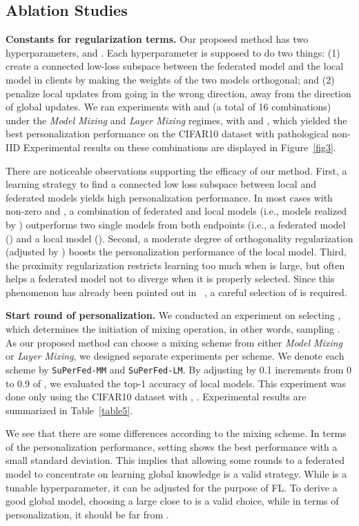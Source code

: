 \documentclass[sigconf]{acmart}
\begin{document}
\subsection{Ablation Studies} 
\noindent\textbf{Constants for regularization terms.} 
Our proposed method has two hyperparameters,  and . Each hyperparameter is supposed to do two things: (1) create a connected low-loss subspace between the federated model and the local model in clients by making the weights of the two models orthogonal; and (2) penalize local updates from going in the wrong direction, away from the direction of global updates.
We ran experiments with  and  (a total of 16 combinations) under the \textit{Model Mixing} and \textit{Layer Mixing} regimes, with  and , which yielded the best personalization performance on the CIFAR10 dataset with pathological non-IID Experimental results on these combinations are displayed in Figure~\ref{fig3}.

There are noticeable observations supporting the efficacy of our method. First, a learning strategy to find a connected low loss subspace between local and federated models yields high personalization performance. In most cases with non-zero  and , a combination of federated and local models (i.e., models realized by ) outperforms two single models from both endpoints (i.e., a federated model () and a local model (). Second, a moderate degree of orthogonality regularization (adjusted by ) boosts the personalization performance of the local model.
Third, the proximity regularization restricts learning too much when  is large, but often helps a federated model not to diverge when it is properly selected. Since this phenomenon has already been pointed out in ~\cite{fedprox, pfedme}, a careful selection of  is required.

\smallskip
\noindent\textbf{Start round of personalization.} We conducted an experiment on selecting , which determines the initiation of mixing operation, in other words, sampling . As our proposed method can choose a mixing scheme from either \textit{Model Mixing} or \textit{Layer Mixing}, we designed separate experiments per scheme. We denote each scheme by \texttt{SuPerFed-MM} and \texttt{SuPerFed-LM}. By adjusting  by 0.1 increments from 0 to 0.9 of , we evaluated the top-1 accuracy of local models. This experiment was done only using the CIFAR10 dataset with , . Experimental results are summarized in Table~\ref{table5}. 

We see that there are some differences according to the mixing scheme. In terms of the personalization performance, setting  shows the best performance with a small standard deviation. This implies that allowing some rounds to a federated model to concentrate on learning global knowledge is a valid strategy. While  is a tunable hyperparameter, it can be adjusted for the purpose of FL. To derive a good global model, choosing a large  close to  is a valid choice, while in terms of personalization, it should be far from .
\end{document}
